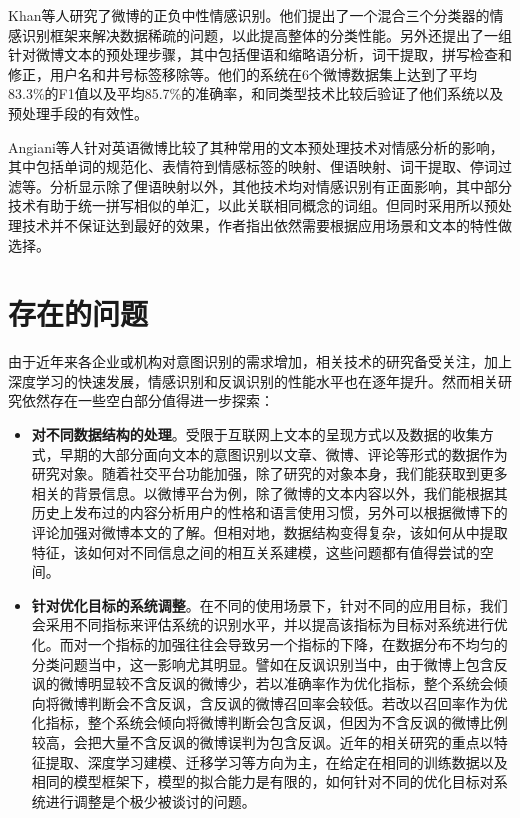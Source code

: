Khan等人\cite{khan2014tom}研究了微博的正负中性情感识别。他们提出了一个混合三个分类器的情感识别框架来解决数据稀疏的问题，以此提高整体的分类性能。另外还提出了一组针对微博文本的预处理步骤，其中包括俚语和缩略语分析，词干提取，拼写检查和修正，用户名和井号标签移除等。他们的系统在6个微博数据集上达到了平均83.3\%的F1值以及平均85.7\%的准确率，和同类型技术比较后验证了他们系统以及预处理手段的有效性。

Angiani等人\cite{angiani2016comparison}针对英语微博比较了其种常用的文本预处理技术对情感分析的影响，其中包括单词的规范化、表情符到情感标签的映射、俚语映射、词干提取、停词过滤等。分析显示除了俚语映射以外，其他技术均对情感识别有正面影响，其中部分技术有助于统一拼写相似的单汇，以此关联相同概念的词组。但同时采用所以预处理技术并不保证达到最好的效果，作者指出依然需要根据应用场景和文本的特性做选择。

\section{存在的问题}

由于近年来各企业或机构对意图识别的需求增加，相关技术的研究备受关注，加上深度学习的快速发展，情感识别和反讽识别的性能水平也在逐年提升。然而相关研究依然存在一些空白部分值得进一步探索：

\begin{itemize}

\item {\bf 对不同数据结构的处理}。受限于互联网上文本的呈现方式以及数据的收集方式，早期的大部分面向文本的意图识别以文章、微博、评论等形式的数据作为研究对象。随着社交平台功能加强，除了研究的对象本身，我们能获取到更多相关的背景信息。以微博平台为例，除了微博的文本内容以外，我们能根据其历史上发布过的内容分析用户的性格和语言使用习惯，另外可以根据微博下的评论加强对微博本文的了解。但相对地，数据结构变得复杂，该如何从中提取特征，该如何对不同信息之间的相互关系建模，这些问题都有值得尝试的空间。

\item {\bf 针对优化目标的系统调整}。在不同的使用场景下，针对不同的应用目标，我们会采用不同指标来评估系统的识别水平，并以提高该指标为目标对系统进行优化。而对一个指标的加强往往会导致另一个指标的下降，在数据分布不均匀的分类问题当中，这一影响尤其明显。譬如在反讽识别当中，由于微博上包含反讽的微博明显较不含反讽的微博少，若以准确率作为优化指标，整个系统会倾向将微博判断会不含反讽，含反讽的微博召回率会较低。若改以召回率作为优化指标，整个系统会倾向将微博判断会包含反讽，但因为不含反讽的微博比例较高，会把大量不含反讽的微博误判为包含反讽。近年的相关研究的重点以特征提取、深度学习建模、迁移学习等方向为主，在给定在相同的训练数据以及相同的模型框架下，模型的拟合能力是有限的，如何针对不同的优化目标对系统进行调整是个极少被谈讨的问题。

\end{itemize}

